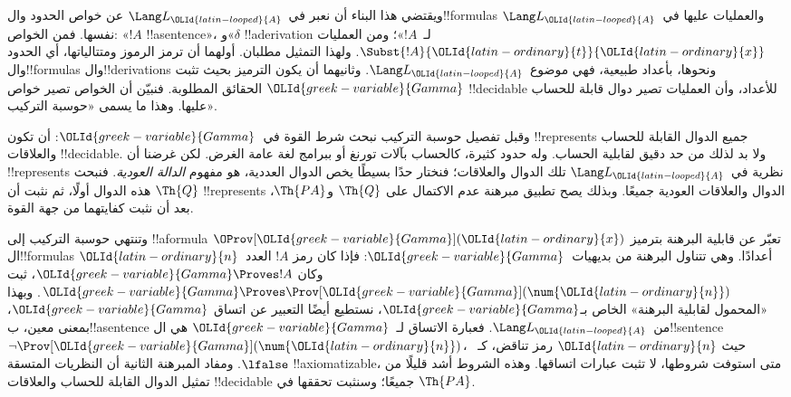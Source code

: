 \documentclass[../../../include/open-logic-section]{subfiles}
\begin{document}
ويقتضي هذا البناء أن نعبر في~$\Lang L_{\OLId{latin-looped}{A}}$
عن خواص الحدود وال!!{formula}s والعمليات
عليها في~$\Lang L_{\OLId{latin-looped}{A}}$ نفسها. فمن الخواص:
«$!A$ !!a{sentence}»، و«$\delta$
!!a{derivation} لـ~$!A$»؛ ومن العمليات
$\Subst{!A}{{\OLId{latin-ordinary}{t}}}{{\OLId{latin-ordinary}{x}}}$. ولهذا التمثيل مطلبان.
أولهما أن ترمز الرموز ومتتالياتها، أي الحدود
وال!!{formula}s وال!!{derivation}s ونحوها،
بأعداد طبيعية، فهي موضوع~$\Lang L_{\OLId{latin-looped}{A}}$.
وثانيهما أن يكون الترميز بحيث تثبت ${\OLId{greek-variable}{Gamma}}$
الحقائق المطلوبة. فنبيّن أن الخواص تصير
خواص !!{decidable} للأعداد، وأن العمليات
تصير دوال قابلة للحساب عليها. وهذا ما يسمى
«حوسبة التركيب».

وقبل تفصيل حوسبة التركيب نبحث شرط القوة
في~${\OLId{greek-variable}{Gamma}}$: أن تكون !!{represents} جميع
الدوال القابلة للحساب والعلاقات !!{decidable}.
ولا بد لذلك من حد دقيق لقابلية الحساب.
وله حدود كثيرة، كالحساب بآلات تورنغ أو
ببرامج لغة عامة الغرض. لكن غرضنا أن
!!{represents} نظرية في~$\Lang L_{\OLId{latin-looped}{A}}$
تلك الدوال والعلاقات؛ فنختار حدًا بسيطًا
يخص الدوال العددية، هو مفهوم \emph{الدالة
العودية}. فنبحث هذه الدوال أولًا، ثم نثبت
أن $\Th{Q}$ !!{represents} الدوال والعلاقات
العودية جميعًا. وبذلك يصح تطبيق مبرهنة
عدم الاكتمال على $\Th{Q}$ و$\Th{PA}$،
بعد أن نثبت كفايتهما من جهة القوة.

وتنتهي حوسبة التركيب إلى !!a{formula}
$\OProv[{\OLId{greek-variable}{Gamma}}]({\OLId{latin-ordinary}{x}})$ تعبّر عن قابلية البرهنة
بترميز ال!!{formula}s أعدادًا. وهي تتناول
البرهنة من بديهيات~${\OLId{greek-variable}{Gamma}}$: فإذا كان
رمز $!A$ العدد~${\OLId{latin-ordinary}{n}}$ وكان ${\OLId{greek-variable}{Gamma}}\Proves !A$،
ثبت ${\OLId{greek-variable}{Gamma}}\Proves\Prov[{\OLId{greek-variable}{Gamma}}](\num{{\OLId{latin-ordinary}{n}}})$.
وبهذا «المحمول لقابلية البرهنة» الخاص
بـ${\OLId{greek-variable}{Gamma}}$، نستطيع أيضًا التعبير عن اتساق
${\OLId{greek-variable}{Gamma}}$، بمعنى معين، ب!!a{sentence}
من~$\Lang L_{\OLId{latin-looped}{A}}$. فعبارة الاتساق
لـ~${\OLId{greek-variable}{Gamma}}$ هي ال!!{sentence}
$\lnot\Prov[{\OLId{greek-variable}{Gamma}}](\num{{\OLId{latin-ordinary}{n}}})$، حيث
${\OLId{latin-ordinary}{n}}$ رمز تناقض، كـ~$\lfalse$.
ومفاد المبرهنة الثانية أن النظريات المتسقة
!!{axiomatizable}، متى استوفت شروطها،
لا تثبت عبارات اتساقها. وهذه الشروط
أشد قليلًا من تمثيل الدوال القابلة
للحساب والعلاقات !!{decidable} جميعًا؛
وسنثبت تحققها في $\Th{PA}$.
\end{document}
